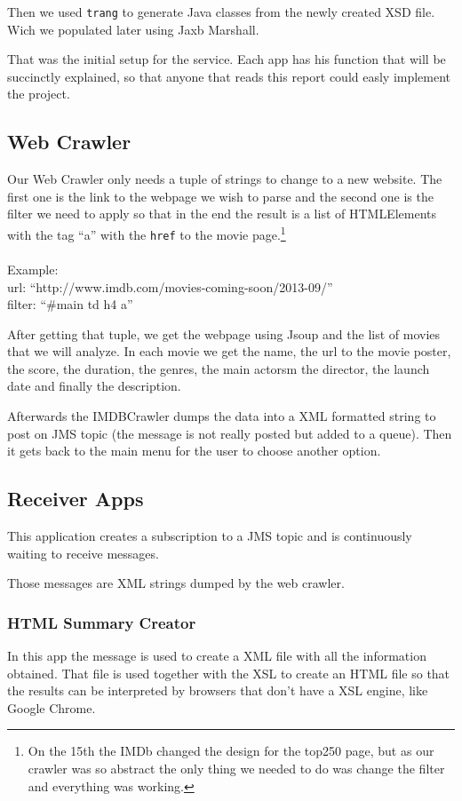 \documentclass[a4paper]{article}
\begin{document}
Then we used \texttt{trang} to generate Java classes from the newly created XSD file. Wich we populated later using Jaxb Marshall.

That was the initial setup for the service. Each app has his function that will be succinctly explained, so that anyone that reads this report could easly implement the project.

\subsection{Web Crawler}
\indent \indent Our Web Crawler only needs a tuple of strings to change to a new website. The first one is the link to the webpage we wish to parse and the second one is the filter we need to apply so that in the end the result is a list of HTMLElements with the tag ``a'' with the \texttt{href} to the movie page.\footnote{On the 15th the IMDb changed the design for the top250 page, but as our crawler was so abstract the only thing we needed to do was change the filter and everything was working.}\\
\\Example:\\url: ``http://www.imdb.com/movies-coming-soon/2013-09/''\\filter: ``\#main td h4 a''

After getting that tuple, we get the webpage using Jsoup and the list of movies that we will analyze. In each movie we get the name, the url to the movie poster, the score, the duration, the genres, the main actorsm the director, the launch date and finally the description.

Afterwards the IMDBCrawler dumps the data into a XML formatted string to post on JMS topic (the message is not really posted but added to a queue). Then it gets back to the main menu for the user to choose another option.

\clearpage
\subsection{Receiver Apps}
\indent \indent This application creates a subscription to a JMS topic and is continuously waiting to receive messages.

Those messages are XML strings dumped by the web crawler.
\subsubsection{HTML Summary Creator}
\indent \indent In this app the message is used to create a XML file with all the information obtained. That file is used together with the XSL to create an HTML file so that the results can be interpreted by browsers that don't have a XSL engine, like Google Chrome.
\end{document}
